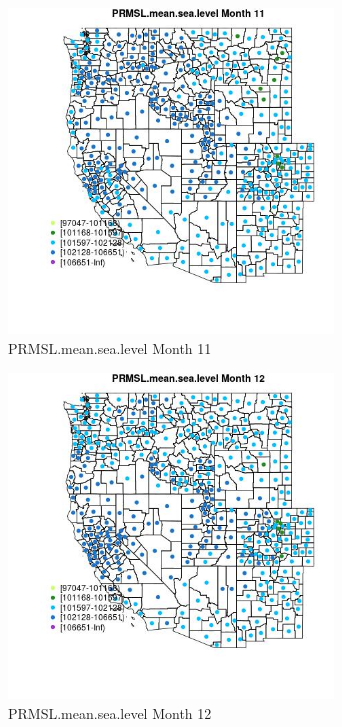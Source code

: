 \begin{figure} 
\centering  
\includegraphics[width=0.77\textwidth]{Code_Outputs/df_report_ML_predictors_CountyCentroid_Locations_Dates_2008-01-01to2018-12-31_MapObsMo11PRMSLmeansealevel.jpg} 
\caption{\label{fig:df_report_ML_predictors_CountyCentroid_Locations_Dates_2008-01-01to2018-12-31MapObsMo11PRMSLmeansealevel}PRMSL.mean.sea.level Month 11} 
\end{figure} 
 

\begin{figure} 
\centering  
\includegraphics[width=0.77\textwidth]{Code_Outputs/df_report_ML_predictors_CountyCentroid_Locations_Dates_2008-01-01to2018-12-31_MapObsMo12PRMSLmeansealevel.jpg} 
\caption{\label{fig:df_report_ML_predictors_CountyCentroid_Locations_Dates_2008-01-01to2018-12-31MapObsMo12PRMSLmeansealevel}PRMSL.mean.sea.level Month 12} 
\end{figure} 
 


